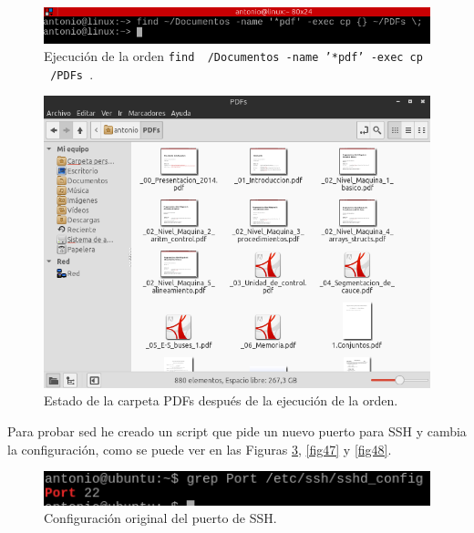 \begin{figure}[H]
    \begin{center}
        \includegraphics[scale=0.6]{imagenes/img47}
        \caption{Ejecución de la orden  \texttt{find ~/Documentos -name '*pdf' -exec cp {} ~/PDFs \;}. }
        \label{fig44}
    \end{center}
\end{figure}

\begin{figure}[H]
    \begin{center}
        \includegraphics[scale=0.5]{imagenes/img48}
        \caption{Estado de la carpeta PDFs después de la ejecución de la orden.}
        \label{fig45}
    \end{center}
\end{figure}


Para probar sed he creado un script que pide un nuevo puerto para SSH y cambia la configuración, como se puede ver en las Figuras \ref{fig46}, \ref{fig47} y \ref{fig48}.\cite{sed}

\begin{figure}[H]
    \begin{center}
        \includegraphics[scale=0.8]{imagenes/img49}
        \caption{Configuración original del puerto de SSH.}
        \label{fig46}
    \end{center}
\end{figure}

